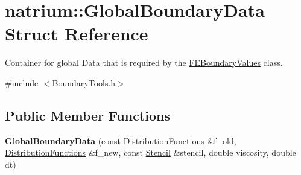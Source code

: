 \hypertarget{structnatrium_1_1GlobalBoundaryData}{
\section{natrium::GlobalBoundaryData Struct Reference}
\label{structnatrium_1_1GlobalBoundaryData}
}


Container for global Data that is required by the \hyperlink{classnatrium_1_1FEBoundaryValues}{FEBoundaryValues} class.  


{\ttfamily \#include $<$BoundaryTools.h$>$}\subsection*{Public Member Functions}
\begin{DoxyCompactItemize}
\item 
\hypertarget{structnatrium_1_1GlobalBoundaryData_a5ee5214222b99f43fe7dda2fae1541b2}{
{\bfseries GlobalBoundaryData} (const \hyperlink{classnatrium_1_1DistributionFunctions}{DistributionFunctions} \&f\_\-old, \hyperlink{classnatrium_1_1DistributionFunctions}{DistributionFunctions} \&f\_\-new, const \hyperlink{classnatrium_1_1Stencil}{Stencil} \&stencil, double viscosity, double dt)}
\label{structnatrium_1_1GlobalBoundaryData_a5ee5214222b99f43fe7dda2fae1541b2}

\end{DoxyCompactItemize}
